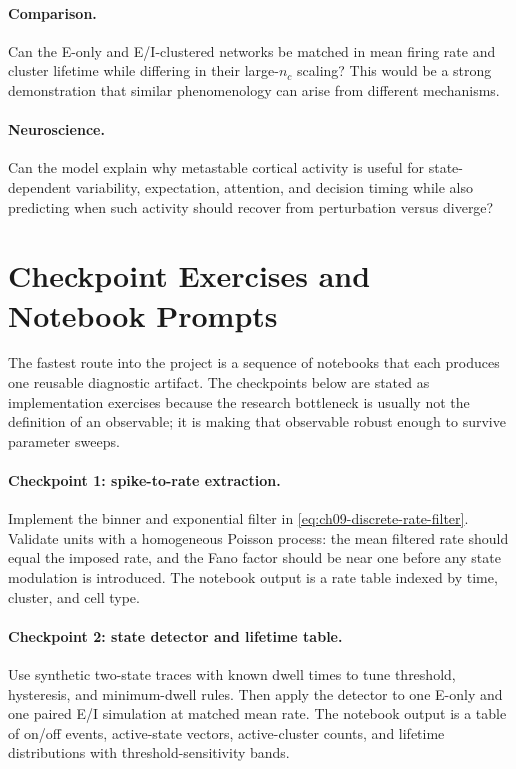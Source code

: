 \paragraph{Comparison.}
Can the E-only and E/I-clustered networks be matched in mean firing rate and
cluster lifetime while differing in their large-\(n_c\) scaling? This would be
a strong demonstration that similar phenomenology can arise from different
mechanisms.

\paragraph{Neuroscience.}
Can the model explain why metastable cortical activity is useful for state-
dependent variability, expectation, attention, and decision timing while also
predicting when such activity should recover from perturbation versus diverge?

\section{Checkpoint Exercises and Notebook Prompts}
\label{sec:ch10-checkpoint-exercises}

The fastest route into the project is a sequence of notebooks that each
produces one reusable diagnostic artifact. The checkpoints below are stated as
implementation exercises because the research bottleneck is usually not the
definition of an observable; it is making that observable robust enough to
survive parameter sweeps.

\paragraph{Checkpoint 1: spike-to-rate extraction.}
Implement the binner and exponential filter in
\eqref{eq:ch09-discrete-rate-filter}. Validate units with a homogeneous
Poisson process: the mean filtered rate should equal the imposed rate, and the
Fano factor should be near one before any state modulation is introduced. The
notebook output is a rate table indexed by time, cluster, and cell type.

\paragraph{Checkpoint 2: state detector and lifetime table.}
Use synthetic two-state traces with known dwell times to tune threshold,
hysteresis, and minimum-dwell rules. Then apply the detector to one E-only and
one paired E/I simulation at matched mean rate. The notebook output is a table
of on/off events, active-state vectors, active-cluster counts, and lifetime
distributions with threshold-sensitivity bands.

